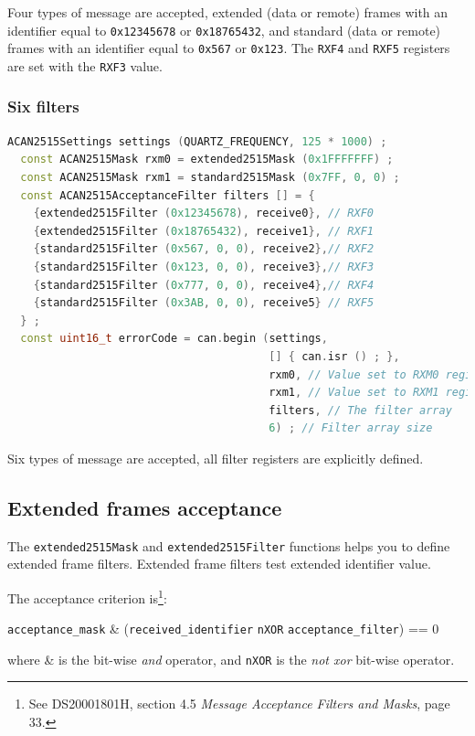 \documentclass[10pt, a4paper, obeyspaces]{extarticle}
\newcommand \subsubsectionLabel[2]{\subsubsection{#1}\label{subsubsec:#2}}
\begin{document}
Four types of message are accepted, extended (data or remote) frames with an identifier equal to \texttt{0x12345678} or \texttt{0x18765432}, and standard (data or remote) frames with an identifier equal to \texttt{0x567} or \texttt{0x123}. The \texttt{RXF4} and \texttt{RXF5} registers are set with the \texttt{RXF3} value.








\subsubsectionLabel{Six filters}{sixFilters}
{ \small\begin{lstlisting}[language=c++]
  ACAN2515Settings settings (QUARTZ_FREQUENCY, 125 * 1000) ;
  const ACAN2515Mask rxm0 = extended2515Mask (0x1FFFFFFF) ;
  const ACAN2515Mask rxm1 = standard2515Mask (0x7FF, 0, 0) ;
  const ACAN2515AcceptanceFilter filters [] = {
    {extended2515Filter (0x12345678), receive0}, // RXF0
    {extended2515Filter (0x18765432), receive1}, // RXF1
    {standard2515Filter (0x567, 0, 0), receive2},// RXF2
    {standard2515Filter (0x123, 0, 0), receive3},// RXF3
    {standard2515Filter (0x777, 0, 0), receive4},// RXF4
    {standard2515Filter (0x3AB, 0, 0), receive5} // RXF5
  } ;
  const uint16_t errorCode = can.begin (settings,
                                        [] { can.isr () ; },
                                        rxm0, // Value set to RXM0 register
                                        rxm1, // Value set to RXM1 register
                                        filters, // The filter array
                                        6) ; // Filter array size
\end{lstlisting}}

Six types of message are accepted, all filter registers are explicitly defined.










\subsection{Extended frames acceptance}

The \texttt{extended2515Mask} and \texttt{extended2515Filter} functions helps you to define extended frame filters. Extended frame filters test extended identifier value.

The acceptance criterion is\footnote{See DS20001801H, section 4.5 \emph{Message Acceptance Filters and Masks}, page 33.}:

\begin{center}
\texttt{acceptance\_mask} \& (\texttt{received\_identifier} \texttt{nXOR} \texttt{acceptance\_filter}) == 0
\end{center}
where \& is the bit-wise \emph{and} operator, and \texttt{nXOR} is the \emph{not xor} bit-wise operator.
\end{document}

